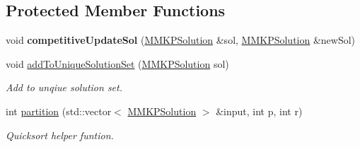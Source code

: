 \subsection*{Protected Member Functions}
\begin{DoxyCompactItemize}
\item 
\hypertarget{class_m_m_k_p___meta_heuristic_a712e028ff1bb1812ea16309994fd254e}{void {\bfseries competitive\+Update\+Sol} (\hyperlink{class_m_m_k_p_solution}{M\+M\+K\+P\+Solution} \&sol, \hyperlink{class_m_m_k_p_solution}{M\+M\+K\+P\+Solution} \&new\+Sol)}\label{class_m_m_k_p___meta_heuristic_a712e028ff1bb1812ea16309994fd254e}

\item 
void \hyperlink{class_m_m_k_p___meta_heuristic_a5f9cad13b11c32134cb4d56275dbdff1}{add\+To\+Unique\+Solution\+Set} (\hyperlink{class_m_m_k_p_solution}{M\+M\+K\+P\+Solution} sol)
\begin{DoxyCompactList}\small\item\em Add to unqiue solution set. \end{DoxyCompactList}\item 
\hypertarget{class_m_m_k_p___meta_heuristic_a39666b38d835cd40e39bd40e6210a3de}{int \hyperlink{class_m_m_k_p___meta_heuristic_a39666b38d835cd40e39bd40e6210a3de}{partition} (std\+::vector$<$ \hyperlink{class_m_m_k_p_solution}{M\+M\+K\+P\+Solution} $>$ \&input, int p, int r)}\label{class_m_m_k_p___meta_heuristic_a39666b38d835cd40e39bd40e6210a3de}

\begin{DoxyCompactList}\small\item\em Quicksort helper funtion. \end{DoxyCompactList}\end{DoxyCompactItemize}
